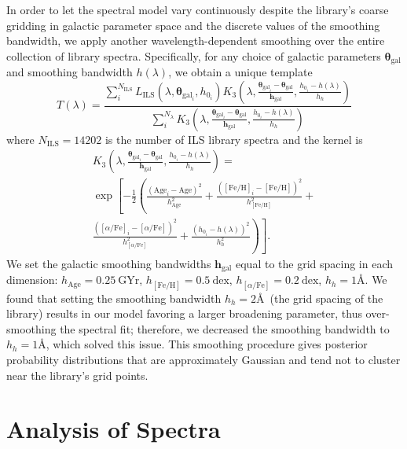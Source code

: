\documentclass[twocolumn]{aastex6}
\def\feh{\mathrm{[Fe/H]}}
\def\afe{[\alpha/\mathrm{Fe}]}
\def\dex{\mathrm{dex}}
\begin{document}
In order to let the spectral model vary continuously despite the library's coarse gridding in galactic parameter space and the discrete values of the smoothing bandwidth, we apply another wavelength-dependent smoothing over the entire collection of library spectra.
Specifically, for any choice of galactic parameters $\bm{\theta}_\mathrm{gal}$ and smoothing bandwidth $h(\lambda)$, we obtain a unique template
\begin{equation}
\label{T_lam}
T(\lambda)=\frac{\sum\limits_i^{N_\mathrm{ILS}}L_\mathrm{ILS}\left(\lambda,\bm{\theta}_{\mathrm{gal}_i},h_{0_i}\right) K_3\left(\lambda,\frac{\bm{\theta}_{\mathrm{gal}_i}-\bm{\theta}_\mathrm{gal}}{\bm{h}_\mathrm{gal}},\frac{h_{0_i}-h(\lambda)}{h_h}\right)}{\sum\limits^{N_\lambda}_iK_3\left(\lambda,\frac{\bm{\theta}_{\mathrm{gal}_i}-\bm{\theta}_\mathrm{gal}}{\bm{h}_\mathrm{gal}},\frac{h_{0_i}-h(\lambda)}{h_h}\right)}
\end{equation}
where $N_\mathrm{ILS}=14202$ is the number of ILS library spectra and the kernel is
\begin{multline}
\label{K3}
K_3\left(\lambda,\frac{\bm{\theta}_{\mathrm{gal}_i}-\bm{\theta}_\mathrm{gal}}{\bm{h}_\mathrm{gal}},\frac{h_{0_i}-h(\lambda)}{h_h}\right)=\\
\exp\left[-\frac12
\left(\frac{\left(\mathrm{Age}_i-\mathrm{Age}\right)^2}{h_\mathrm{Age}^2}+
\frac{\left(\mathrm{[Fe/H]}_i-\mathrm{[Fe/H]}\right)^2}{h_\mathrm{[Fe/H]}^2}+\right.\right.\\
\left.{}\left.{}\frac{\left([\alpha/\mathrm{Fe}]_i-[\alpha/\mathrm{Fe}]\right)^2}{h_{\afe}^2}+
\frac{\left(h_{0_i}-h(\lambda)\right)^2}{h_h^2}\right)
\right].
\end{multline}
We set the galactic smoothing bandwidths $\bm{h}_\mathrm{gal}$ equal to the grid spacing in each dimension: $h_\mathrm{Age}=0.25\ \mathrm{GYr}$, $h_\feh=0.5\ \dex$, $h_{\afe}=0.2\ \dex$, $h_h=1$\AA.
We found that setting the smoothing bandwidth $h_h=2$\AA\ (the grid spacing of the library) results in our model favoring a larger broadening parameter, thus over-smoothing the spectral fit; therefore, we decreased the smoothing bandwidth to $h_h=1$\AA, which solved this issue.
This smoothing procedure gives posterior probability distributions that are approximately Gaussian and tend not to cluster near the library's grid points.

\section{Analysis of Spectra}
\label{Analysis of Spectra}
\end{document}
